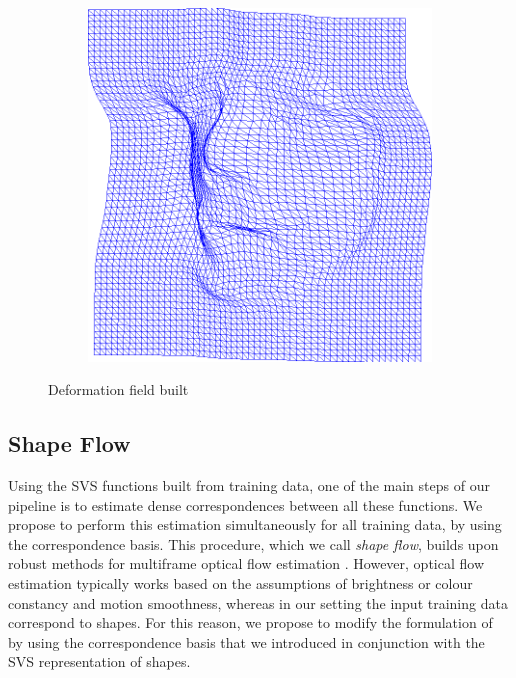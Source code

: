 \begin{figure}[t!]
\begin{subfigure}[b]{0.15\textwidth}
    \end{subfigure}
   	\hfill
    \begin{subfigure}[b]{0.15\textwidth}
            \includegraphics[width=\textwidth]{resources/Fig_Flows/8}
    \end{subfigure}
    \caption{Deformation field built}
    \label{fig:deformationfield}
\end{figure}






\subsection{Shape Flow}
\label{sec:shapeflow}


Using the SVS functions built from training data, one of the main steps of our pipeline is to estimate dense correspondences between all these functions. We propose to perform this estimation simultaneously for all training data, by using the correspondence basis. This procedure, which we call \emph{shape flow}, builds upon robust methods for multiframe optical flow estimation \cite{Garg:2013hu}. However, optical flow estimation typically works based on the assumptions of brightness or colour constancy and motion smoothness, whereas in our setting the input training data correspond to shapes. For this reason, we propose to modify the formulation of \cite{Garg:2013hu} by using the correspondence basis that we introduced in conjunction with the SVS representation of shapes.


